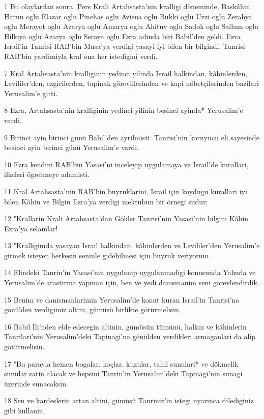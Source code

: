 \par 1 Bu olaylardan sonra, Pers Krali Artahsasta'nin kralligi döneminde, Baskâhin Harun oglu Elazar oglu Pinehas oglu Avisua oglu Bukki oglu Uzzi oglu Zerahya oglu Merayot oglu Azarya oglu Amarya oglu Ahituv oglu Sadok oglu Sallum oglu Hilkiya oglu Azarya oglu Seraya oglu Ezra adinda biri Babil'den geldi. Ezra Israil'in Tanrisi RAB'bin Musa'ya verdigi yasayi iyi bilen bir bilgindi. Tanrisi RAB'bin yardimiyla kral ona her istedigini verdi.
\par 7 Kral Artahsasta'nin kralliginin yedinci yilinda Israil halkindan, kâhinlerden, Levililer'den, ezgicilerden, tapinak görevlilerinden ve kapi nöbetçilerinden bazilari Yerusalim'e gitti.
\par 8 Ezra, Artahsasta'nin kralliginin yedinci yilinin besinci ayinda* Yerusalim'e vardi.
\par 9 Birinci ayin birinci günü Babil'den ayrilmisti. Tanrisi'nin koruyucu eli sayesinde besinci ayin birinci günü Yerusalim'e vardi.
\par 10 Ezra kendini RAB'bin Yasasi'ni inceleyip uygulamaya ve Israil'de kurallari, ilkeleri ögretmeye adamisti.
\par 11 Kral Artahsasta'nin RAB'bin buyruklarini, Israil için koydugu kurallari iyi bilen Kâhin ve Bilgin Ezra'ya verdigi mektubun bir örnegi sudur:
\par 12 "Krallarin Krali Artahsasta'dan Gökler Tanrisi'nin Yasasi'nin bilgini Kâhin Ezra'ya selamlar!
\par 13 "Kralligimda yasayan Israil halkindan, kâhinlerden ve Levililer'den Yerusalim'e gitmek isteyen herkesin seninle gidebilmesi için buyruk veriyorum.
\par 14 Elindeki Tanrin'in Yasasi'nin uygulanip uygulanmadigi konusunda Yahuda ve Yerusalim'de arastirma yapman için, ben ve yedi danismanim seni görevlendirdik.
\par 15 Benim ve danismanlarimin Yerusalim'de konut kuran Israil'in Tanrisi'na gönülden verdigimiz altini, gümüsü birlikte götürmelisin.
\par 16 Babil Ili'nden elde edecegin altinin, gümüsün tümünü, halkin ve kâhinlerin Tanrilari'nin Yerusalim'deki Tapinagi'na gönülden verdikleri armaganlari da alip götürmelisin.
\par 17 "Bu parayla hemen bogalar, koçlar, kuzular, tahil sunulari* ve dökmelik sunular satin alacak ve hepsini Tanrin'in Yerusalim'deki Tapinagi'nin sunagi üzerinde sunacaksin.
\par 18 Sen ve kardeslerin artan altini, gümüsü Tanriniz'in istegi uyarinca dilediginiz gibi kullanin.
